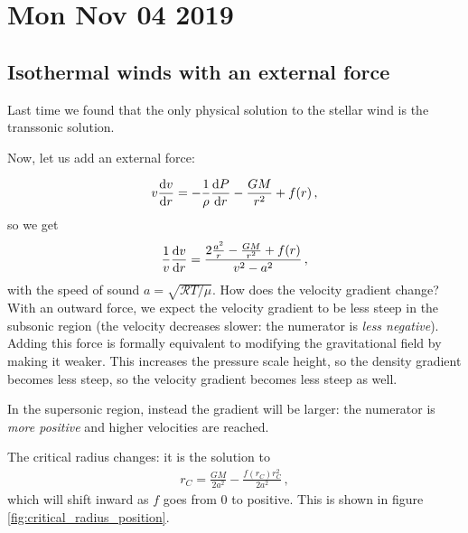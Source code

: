 \documentclass[main.tex]{subfiles}
\begin{document}
\section*{Mon Nov 04 2019}


\subsection{Isothermal winds with an external force}

Last time we found that the only physical solution to the stellar wind is the transsonic solution.

Now, let us add an external force:


%
\begin{align}
  v \dv{v}{r} = - \frac{1}{\rho } \dv{P}{r} - \frac{GM}{r^2} + f(r)
\,,
\end{align}
%
so we get 
%
\begin{align}
  \frac{1}{v} \dv{v}{r} = \frac{2 \frac{a^2}{r} - \frac{GM}{r^2} + f(r)}{v^2 - a^2}
\,,
\end{align}
%
with the speed of sound \(a = \sqrt{\mathcal{R} T / \mu } \). How does the velocity gradient change?
With an outward force, we expect the velocity gradient to be less steep in the subsonic region (the velocity decreases slower: the numerator is \emph{less negative}).
Adding this force is formally equivalent to modifying the gravitational field by making it weaker. This increases the pressure scale height, so the density gradient becomes less steep, so the velocity gradient becomes less steep as well.

In the supersonic region, instead the gradient will be larger: the numerator is \emph{more positive} and higher velocities are reached.

The critical radius changes: it is the solution to 
%
\begin{align}
  r_C = \frac{GM}{2 a^2} - \frac{f(r_C) r_C^2}{2 a^2}
\,,
\end{align}
%
which will shift inward as \(f\) goes from 0 to positive.
This is shown in figure \ref{fig:critical_radius_position}.
\end{document}
